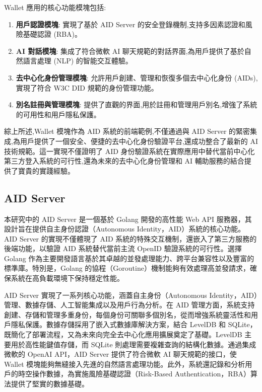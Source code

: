 Wallet 應用的核心功能模塊包括:

\begin{enumerate}
  \item \textbf{用戶認證模塊}: 實現了基於 AID Server 的安全登錄機制,支持多因素認證和風險基礎認證 (RBA)。
  \item \textbf{AI 對話模塊}: 集成了符合微軟 AI 聊天規範的對話界面,為用戶提供了基於自然語言處理 (NLP) 的智能交互體驗。
  \item \textbf{去中心化身份管理模塊}: 允許用戶創建、管理和恢復多個去中心化身份 (AIDs),實現了符合 W3C DID 規範的身份管理功能。
  \item \textbf{別名註冊與管理模塊}: 提供了直觀的界面,用於註冊和管理用戶別名,增強了系統的可用性和用戶隱私保護。
\end{enumerate}

綜上所述,Wallet 模塊作為 AID 系統的前端範例,不僅通過與 AID Server 的緊密集成,為用戶提供了一個安全、便捷的去中心化身份驗證平台,還成功整合了最新的 AI 技術規範。這一實現不僅證明了 AID 身份驗證系統在實際應用中替代當前中心化第三方登入系統的可行性,還為未來的去中心化身份管理和 AI 輔助服務的結合提供了寶貴的實踐經驗。

\subsection{AID Server}

本研究中的 AID Server 是一個基於 Golang 開發的高性能 Web API 服務器，其設計旨在提供自主身份認證（Autonomous Identity，AID）系統的核心功能。AID Server 的實現不僅體現了 AID 系統的特殊交互機制，還嵌入了第三方服務的後端功能，以驗證 AID 系統替代當前主流 OpenID 驗證系統的可行性。選擇 Golang 作為主要開發語言基於其卓越的並發處理能力、跨平台兼容性以及豐富的標準庫。特別是，Golang 的協程（Goroutine）機制能夠有效處理高並發請求，確保系統在高負載環境下保持穩定性能。

AID Server 實現了一系列核心功能，涵蓋自主身份（Autonomous Identity，AID）管理、數據存儲、人工智能集成以及用戶行為分析。在 AID 管理方面，系統支持創建、存儲和管理多重身份，每個身份可關聯多個別名，從而增強系統靈活性和用戶隱私保護。數據存儲採用了嵌入式數據庫解決方案，結合 LevelDB 和 SQLite，既簡化了部署流程，又為未來向完全去中心化應用擴展奠定了基礎。LevelDB 主要用於高性能鍵值存儲，而 SQLite 則處理需要複雜查詢的結構化數據。通過集成微軟的 OpenAI API，AID Server 提供了符合微軟 AI 聊天規範的接口，使 Wallet 模塊能夠無縫接入先進的自然語言處理功能。此外，系統還記錄和分析用戶的時空操作數據，為實施風險基礎認證（Risk-Based Authentication，RBA）算法提供了堅實的數據基礎。

